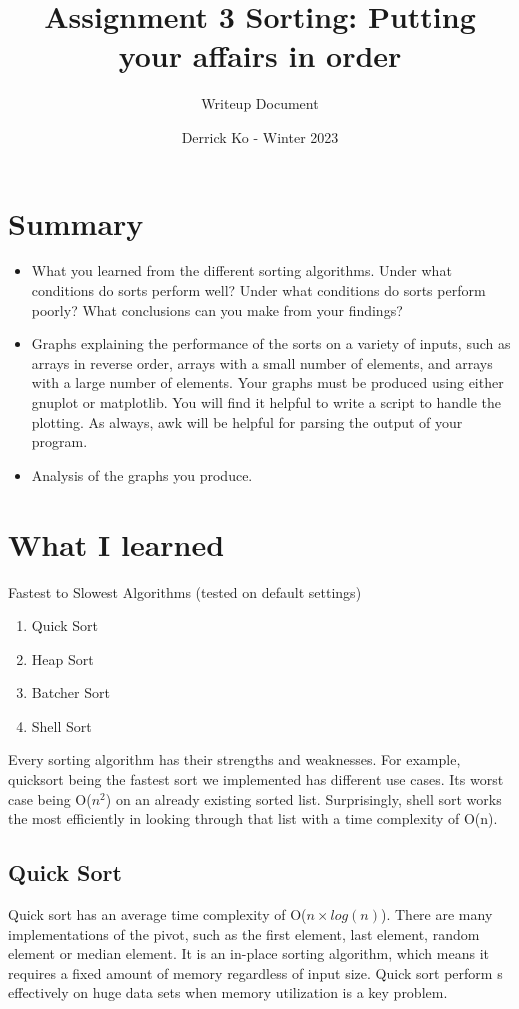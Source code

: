 \documentclass{article}
\title{Assignment 3 Sorting: Putting your affairs in order}
\author{Writeup Document}
\date{Derrick Ko - Winter 2023}
\begin{document}
\maketitle

\section{Summary}
\begin{itemize}
\item What you learned from the different sorting algorithms. Under what conditions do sorts perform well?
Under what conditions do sorts perform poorly? What conclusions can you make
from your findings?
\item Graphs explaining the performance of the sorts on a variety of inputs, such as arrays in reverse
order, arrays with a small number of elements, and arrays with a large number of elements.
Your graphs must be produced using either gnuplot or matplotlib. You will find it helpful
to write a script to handle the plotting. As always, awk will be helpful for parsing the output
of your program.
\item Analysis of the graphs you produce.
\end{itemize}
\section{What I learned}
Fastest to Slowest Algorithms (tested on default settings)
\begin{enumerate}
\item Quick Sort
\item Heap Sort
\item Batcher Sort
\item Shell Sort
\end{enumerate}
Every sorting algorithm has their strengths and weaknesses. For example, quicksort being the fastest sort we implemented has different use cases. Its worst case being O($n^2$) on an already existing sorted list. Surprisingly, shell sort works the most efficiently in looking through that list with a time complexity of O(n).
\subsection{Quick Sort}
Quick sort has an average time complexity of O($n\times log(n)$). There are many implementations of the pivot, such as the first element, last element, random element or median element. It is an in-place sorting algorithm, which means it requires a fixed amount of memory regardless of input size. Quick sort perform s effectively on huge data sets when memory utilization is a key problem.
\end{document}

